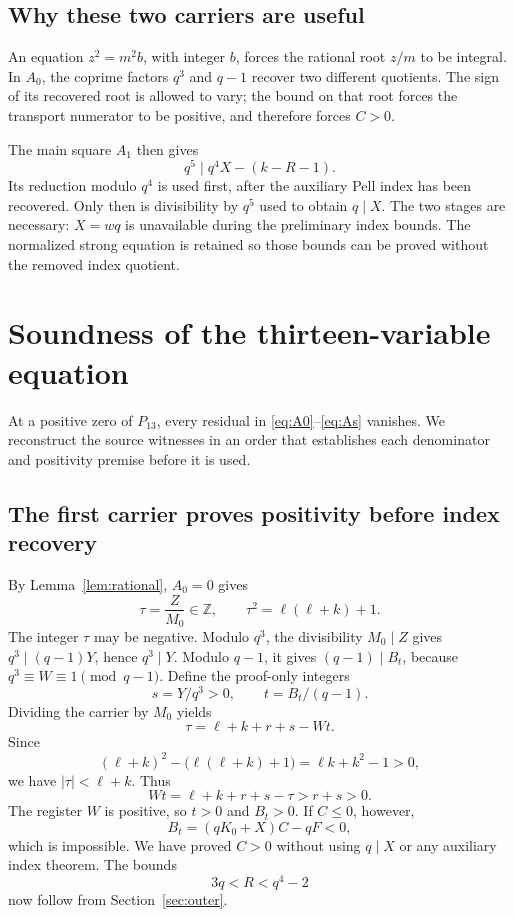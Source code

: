 \documentclass[11pt,a4paper]{article}
\theoremstyle{definition}
\theoremstyle{remark}
\newcommand{\Z}{\mathbb Z}
\begin{document}
\subsection{Why these two carriers are useful}

An equation \(z^2=m^2b\), with integer \(b\), forces the rational root
\(z/m\) to be integral. In \(A_0\), the coprime factors \(q^3\) and
\(q-1\) recover two different quotients. The sign of its recovered root
is allowed to vary; the bound on that root forces the transport numerator
to be positive, and therefore forces \(C>0\).

The main square \(A_1\) then gives
\[
 q^5\mid q^4X-(k-R-1).
\]
Its reduction modulo \(q^4\) is used first, after the auxiliary Pell index
has been recovered. Only then is divisibility by \(q^5\) used to obtain
\(q\mid X\). The two stages are necessary: \(X=wq\) is unavailable during
the preliminary index bounds. The normalized strong equation is retained
so those bounds can be proved without the removed index quotient.

\section{Soundness of the thirteen-variable equation}
\label{sec:sound13}

At a positive zero of \(P_{13}\), every residual in
\eqref{eq:A0}--\eqref{eq:As} vanishes. We reconstruct the source witnesses
in an order that establishes each denominator and positivity premise
before it is used.

\subsection{The first carrier proves positivity before index recovery}

By Lemma~\ref{lem:rational}, \(A_0=0\) gives
\[
 \tau=\frac Z{M_0}\in\Z,\qquad
 \tau^2=\ell(\ell+k)+1.
\]
The integer \(\tau\) may be negative. Modulo \(q^3\), the divisibility
\(M_0\mid Z\) gives \(q^3\mid(q-1)Y\), hence \(q^3\mid Y\).
Modulo \(q-1\), it gives \((q-1)\mid B_t\), because
\(q^3\equiv W\equiv1\pmod{q-1}\).
Define the proof-only integers
\[
 s=Y/q^3>0,\qquad t=B_t/(q-1).
\]
Dividing the carrier by \(M_0\) yields
\begin{equation}
 \tau=\ell+k+r+s-Wt.                         \label{eq:transportroot}
\end{equation}
Since
\[
 (\ell+k)^2-\bigl(\ell(\ell+k)+1\bigr)
       =\ell k+k^2-1>0,
\]
we have \(|\tau|<\ell+k\). Thus
\[
 Wt=\ell+k+r+s-\tau>r+s>0.
\]
The register \(W\) is positive, so \(t>0\) and \(B_t>0\).
If \(C\le0\), however,
\[
 B_t=(qK_0+X)C-qF<0,
\]
which is impossible. We have proved \(C>0\) without using \(q\mid X\)
or any auxiliary index theorem. The bounds
\[
 3q<R<q^4-2
\]
now follow from Section~\ref{sec:outer}.
\end{document}
